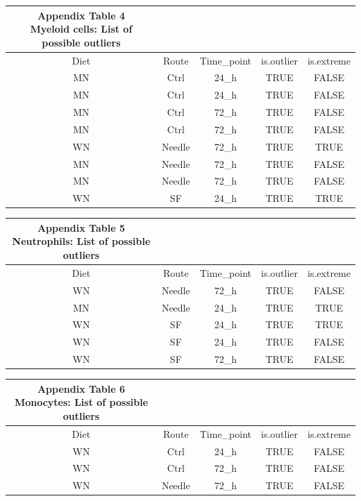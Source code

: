 \documentclass[
  12pt,
  letterpaper,
]{article}
\begin{document}
\begingroup
\fontsize{12.0pt}{14.4pt}\selectfont
\begin{longtable}{ccccc}
\caption*{
{\large \textbf{Appendix Table 4}} \\ 
{\small \textbf{Myeloid cells: List of possible outliers}}
} \\ 
\toprule
{Diet} & {Route} & Time\_point & {is.outlier} & {is.extreme} \\ 
\midrule\addlinespace[2.5pt]
MN & Ctrl & 24\_h & TRUE & FALSE \\ 
MN & Ctrl & 24\_h & TRUE & FALSE \\ 
MN & Ctrl & 72\_h & TRUE & FALSE \\ 
MN & Ctrl & 72\_h & TRUE & FALSE \\ 
WN & Needle & 72\_h & TRUE & TRUE \\ 
MN & Needle & 72\_h & TRUE & FALSE \\ 
MN & Needle & 72\_h & TRUE & FALSE \\ 
WN & SF & 24\_h & TRUE & TRUE \\ 
\bottomrule
\end{longtable}
\endgroup

\begingroup
\fontsize{12.0pt}{14.4pt}\selectfont
\begin{longtable}{ccccc}
\caption*{
{\large \textbf{Appendix Table 5}} \\ 
{\small \textbf{Neutrophils: List of possible outliers}}
} \\ 
\toprule
{Diet} & {Route} & Time\_point & {is.outlier} & {is.extreme} \\ 
\midrule\addlinespace[2.5pt]
WN & Needle & 72\_h & TRUE & FALSE \\ 
MN & Needle & 24\_h & TRUE & TRUE \\ 
WN & SF & 24\_h & TRUE & TRUE \\ 
WN & SF & 24\_h & TRUE & FALSE \\ 
WN & SF & 72\_h & TRUE & FALSE \\ 
\bottomrule
\end{longtable}
\endgroup

\begingroup
\fontsize{12.0pt}{14.4pt}\selectfont
\begin{longtable}{ccccc}
\caption*{
{\large \textbf{Appendix Table 6}} \\ 
{\small \textbf{Monocytes: List of possible outliers}}
} \\ 
\toprule
{Diet} & {Route} & Time\_point & {is.outlier} & {is.extreme} \\ 
\midrule\addlinespace[2.5pt]
WN & Ctrl & 24\_h & TRUE & FALSE \\ 
WN & Ctrl & 72\_h & TRUE & FALSE \\ 
WN & Needle & 72\_h & TRUE & FALSE \\ 
\bottomrule
\end{longtable}
\endgroup
\end{document}
